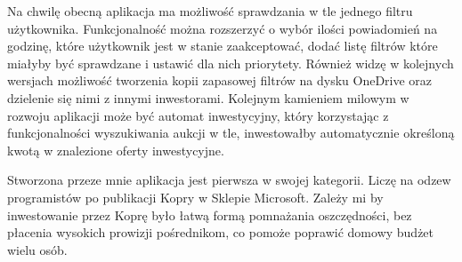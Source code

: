 \documentclass[a4paper,twoside,titlepage,openright]{book}
\begin{document}
Na chwilę obecną aplikacja ma możliwość sprawdzania w tle jednego filtru użytkownika. Funkcjonalność można rozszerzyć o wybór ilości powiadomień na godzinę, które użytkownik jest w stanie zaakceptować, dodać listę filtrów które miałyby być sprawdzane i ustawić dla nich priorytety. Również widzę w kolejnych wersjach możliwość tworzenia kopii zapasowej filtrów na dysku OneDrive oraz dzielenie się nimi z innymi inwestorami. Kolejnym kamieniem milowym w rozwoju aplikacji może być automat inwestycyjny, który korzystając z funkcjonalności wyszukiwania aukcji w tle, inwestowałby automatycznie określoną kwotą w znalezione oferty inwestycyjne.

Stworzona przeze mnie aplikacja jest pierwsza w swojej kategorii. Liczę na odzew programistów po publikacji Kopry w Sklepie Microsoft. Zależy mi by inwestowanie przez Koprę było łatwą formą pomnażania oszczędności, bez płacenia wysokich prowizji pośrednikom, co pomoże poprawić domowy budżet wielu osób.
 
 
 
 
\listoffigures
\end{document}
